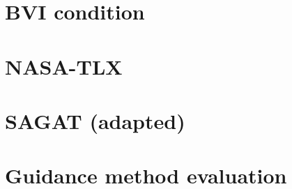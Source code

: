 

\section{BVI condition}
\label{sec:bvi_condition}
\vspace{0.25in}



\section{NASA-TLX}
\label{sec:nasa_tlx}


\pagebreak

\section{SAGAT (adapted)}
\label{sec:sagat}


\pagebreak

\section{Guidance method evaluation}
\label{sec:guidace_evaluation}

